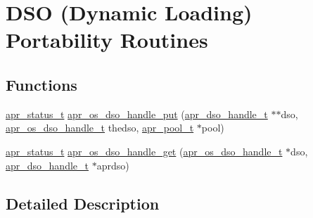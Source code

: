 \hypertarget{group__apr__os__dso}{\section{D\-S\-O (Dynamic Loading) Portability Routines}
\label{group__apr__os__dso}
}
\subsection*{Functions}
\begin{DoxyCompactItemize}
\item 
\hyperlink{group__apr__errno_gaf76ee4543247e9fb3f3546203e590a6c}{apr\-\_\-status\-\_\-t} \hyperlink{group__apr__os__dso_gac8852ec406fad593be38c0dfbb401633}{apr\-\_\-os\-\_\-dso\-\_\-handle\-\_\-put} (\hyperlink{group__apr__dso_ga85e7e28490d026aeed78bd78e9933472}{apr\-\_\-dso\-\_\-handle\-\_\-t} $\ast$$\ast$dso, \hyperlink{group__apr__portabile_ga542684803ee8ab0abd69077697599ec0}{apr\-\_\-os\-\_\-dso\-\_\-handle\-\_\-t} thedso, \hyperlink{group__apr__pools_gaf137f28edcf9a086cd6bc36c20d7cdfb}{apr\-\_\-pool\-\_\-t} $\ast$pool)
\item 
\hyperlink{group__apr__errno_gaf76ee4543247e9fb3f3546203e590a6c}{apr\-\_\-status\-\_\-t} \hyperlink{group__apr__os__dso_ga35f9c50b7e546d0c33985442a9c4aa6e}{apr\-\_\-os\-\_\-dso\-\_\-handle\-\_\-get} (\hyperlink{group__apr__portabile_ga542684803ee8ab0abd69077697599ec0}{apr\-\_\-os\-\_\-dso\-\_\-handle\-\_\-t} $\ast$dso, \hyperlink{group__apr__dso_ga85e7e28490d026aeed78bd78e9933472}{apr\-\_\-dso\-\_\-handle\-\_\-t} $\ast$aprdso)
\end{DoxyCompactItemize}


\subsection{Detailed Description}



